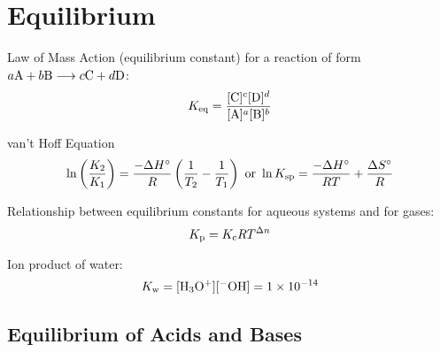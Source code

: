 \documentclass[10pt]{article}
\begin{document}

\newpage
\section{Equilibrium}


Law of Mass Action (equilibrium constant) for a reaction of form $a\textnormal{A}+b\textnormal{B} \longrightarrow c\textnormal{C}+d\textnormal{D}$:
\begin{equation*}
K_\textnormal{eq} = \frac{[\textnormal{C}]^c[\textnormal{D}]^d}{[\textnormal{A}]^a[\textnormal{B}]^b}
\end{equation*}

van't Hoff Equation
\begin{equation*}
\ln \left(\frac{K_2}{K_1}\right) = \frac{-\Delta H^\circ}{R}\left(\frac{1}{T_2}-\frac{1}{T_1}\right) \textnormal{ or } \ln K_\textnormal{sp} = \frac{-\Delta H^{\circ}}{RT} + \frac{\Delta S^{\circ}}{R}
\end{equation*}

Relationship between equilibrium constants for aqueous systems and for gases:
\begin{equation*}
K_\textnormal{p} = K_\textnormal{c}RT^{\Delta n}
\end{equation*}

Ion product of water:
\begin{equation*}
K_\textnormal{w} = [\textnormal{H$_3$O$^{+}$}][\textnormal{$^{-}$OH}] = \num{1e-14}
\end{equation*}


\subsection{Equilibrium of Acids and Bases}
\end{document}

